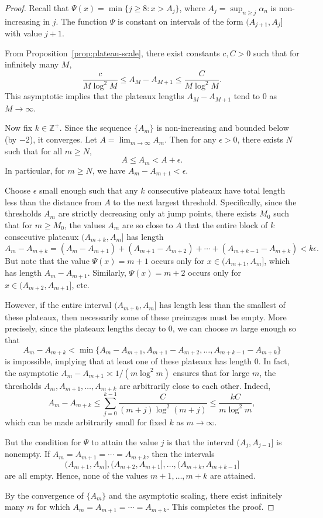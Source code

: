 \documentclass[10pt,a4paper]{amsart}
\begin{document}
\begin{proof}
Recall that $\Psi(x) = \min \{ j \geq 8 : x > A_j \}$, where $A_j = \sup_{n \geq j} \alpha_n$ is non-increasing in $j$. The function $\Psi$ is constant on intervals of the form $(A_{j+1}, A_j]$ with value $j+1$.

From Proposition~\ref{prop:plateau-scale}, there exist constants $c, C > 0$ such that for infinitely many $M$,
\[
\frac{c}{M \log^2 M} \leq A_M - A_{M+1} \leq \frac{C}{M \log^2 M}.
\]
This asymptotic implies that the plateaux lengths $A_M - A_{M+1}$ tend to $0$ as $M \to \infty$.

Now fix $k \in \mathbb{Z}^+$. Since the sequence $\{A_m\}$ is non-increasing and bounded below (by $-2$), it converges. Let $A = \lim_{m \to \infty} A_m$. Then for any $\epsilon > 0$, there exists $N$ such that for all $m \geq N$,
\[
A \leq A_m < A + \epsilon.
\]
In particular, for $m \geq N$, we have $A_m - A_{m+1} < \epsilon$.

Choose $\epsilon$ small enough such that any $k$ consecutive plateaux have total length less than the distance from $A$ to the next largest threshold. Specifically, since the thresholds $A_m$ are strictly decreasing only at jump points, there exists $M_0$ such that for $m \geq M_0$, the values $A_m$ are so close to $A$ that the entire block of $k$ consecutive plateaux $(A_{m+k}, A_m]$ has length
\[
A_m - A_{m+k} = (A_m - A_{m+1}) + (A_{m+1} - A_{m+2}) + \cdots + (A_{m+k-1} - A_{m+k}) < k \epsilon.
\]
But note that the value $\Psi(x) = m+1$ occurs only for $x \in (A_{m+1}, A_m]$, which has length $A_m - A_{m+1}$. Similarly, $\Psi(x) = m+2$ occurs only for $x \in (A_{m+2}, A_{m+1}]$, etc.

However, if the entire interval $(A_{m+k}, A_m]$ has length less than the smallest of these plateaux, then necessarily some of these preimages must be empty. More precisely, since the plateaux lengths decay to $0$, we can choose $m$ large enough so that
\[
A_m - A_{m+k} < \min \{ A_m - A_{m+1}, A_{m+1} - A_{m+2}, \dots, A_{m+k-1} - A_{m+k} \}
\]
is impossible, implying that at least one of these plateaux has length $0$. In fact, the asymptotic $A_m - A_{m+1} \asymp 1/(m \log^2 m)$ ensures that for large $m$, the thresholds $A_m, A_{m+1}, \dots, A_{m+k}$ are arbitrarily close to each other. Indeed,
\[
A_m - A_{m+k} \leq \sum_{j=0}^{k-1} \frac{C}{(m+j) \log^2 (m+j)} \leq \frac{kC}{m \log^2 m},
\]
which can be made arbitrarily small for fixed $k$ as $m \to \infty$.

But the condition for $\Psi$ to attain the value $j$ is that the interval $(A_{j}, A_{j-1}]$ is nonempty. If $A_m = A_{m+1} = \cdots = A_{m+k}$, then the intervals 
\[
(A_{m+1}, A_m], (A_{m+2}, A_{m+1}], \dots, (A_{m+k}, A_{m+k-1}]
\]
are all empty. Hence, none of the values $m+1, \dots, m+k$ are attained.

By the convergence of $\{A_m\}$ and the asymptotic scaling, there exist infinitely many $m$ for which $A_m = A_{m+1} = \cdots = A_{m+k}$. This completes the proof.
\end{proof}
\end{document}
